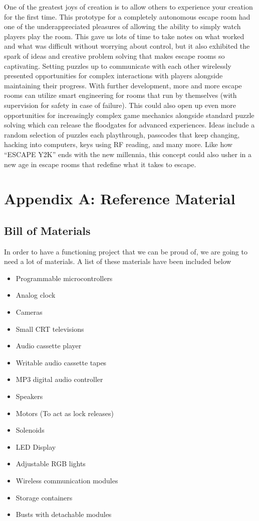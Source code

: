 \documentclass[conference]{IEEEtran}
\begin{document}
\indent One of the greatest joys of creation is to allow others to experience your creation for the first time. This prototype
for a completely autonomous escape room had one of the underappreciated pleasures of allowing the ability to simply watch players play the room.
This gave us lots of time to take notes on what worked and what was difficult without worrying about control, but it also exhibited
the spark of ideas and creative problem solving that makes escape rooms so captivating. Setting puzzles up to communicate with each other
wirelessly presented opportunities for complex interactions with players alongside maintaining their progress. With further development, more and more
escape rooms can utilize smart engineering for rooms that run by themselves (with supervision for safety in case of failure). This could also open up
even more opportunities for increasingly complex game mechanics alongside standard puzzle solving which can release the floodgates for advanced experiences. 
Ideas include a random selection of puzzles each playthrough, passcodes that keep changing, hacking into computers, keys using RF reading, and many more.
Like how ``ESCAPE Y2K'' ends with the new millennia, this concept could also usher in a new age in 
escape rooms that redefine what it takes to escape.

\section{Appendix A: Reference Material}

\subsection{Bill of Materials}
In order to have a functioning project that we can be proud of, we are going to need a lot of materials.
A list of these materials have been included below
\begin{itemize}
    \item Programmable microcontrollers
    \item Analog clock
    \item Cameras
    \item Small CRT televisions
    \item Audio cassette player
    \item Writable audio cassette tapes
    \item MP3 digital audio controller
    \item Speakers
    \item Motors (To act as lock releases)
    \item Solenoids
    \item LED Display
    \item Adjustable RGB lights
    \item Wireless communication modules
    \item Storage containers
    \item Busts with detachable modules
\end{itemize}
\end{document}
